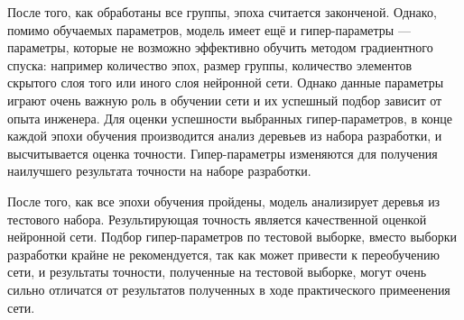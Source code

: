 После того, как обработаны все группы, эпоха считается законченой. Однако, помимо обучаемых параметров, модель имеет ещё и гипер-параметры --- параметры, которые не возможно эффективно обучить методом градиентного спуска: например количество эпох, размер группы, количество элементов скрытого слоя того или иного слоя нейронной сети. Однако данные параметры играют очень важную роль в обучении сети и их успешный подбор зависит от опыта инженера. Для оценки успешности выбранных гипер-параметров, в конце каждой эпохи обучения производится анализ деревьев из набора разработки, и высчитывается оценка точности. Гипер-параметры изменяются для получения наилучшего результата точности на наборе разработки.

После того, как все эпохи обучения пройдены, модель анализирует деревья из тестового набора. Результирующая точность является качественной оценкой нейронной сети. Подбор гипер-параметров по тестовой выборке, вместо выборки разработки крайне не рекомендуется, так как может привести к переобучению сети, и результаты точности, полученные на тестовой выборке, могут очень сильно отличатся от результатов полученных в ходе практического примеенения сети.